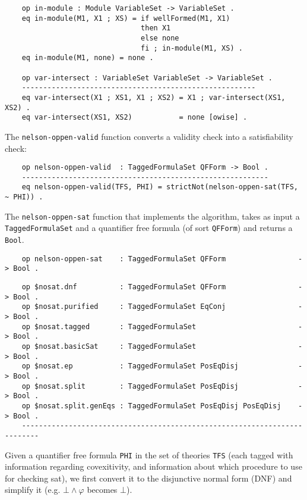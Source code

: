 \documentclass[]{article}
\renewcommand \phi {\varphi}
\begin{document}
\begin{verbatim}
    op in-module : Module VariableSet -> VariableSet .
    eq in-module(M1, X1 ; XS) = if wellFormed(M1, X1)
                                then X1
                                else none
                                fi ; in-module(M1, XS) .
    eq in-module(M1, none) = none .

    op var-intersect : VariableSet VariableSet -> VariableSet .
    -------------------------------------------------------
    eq var-intersect(X1 ; XS1, X1 ; XS2) = X1 ; var-intersect(XS1, XS2) .
    eq var-intersect(XS1, XS2)           = none [owise] .
\end{verbatim}

The \texttt{nelson-oppen-valid} function converts a validity check into
a satisfiability check:

\begin{verbatim}
    op nelson-oppen-valid  : TaggedFormulaSet QFForm -> Bool .
    ----------------------------------------------------------
    eq nelson-oppen-valid(TFS, PHI) = strictNot(nelson-oppen-sat(TFS, ~ PHI)) .
\end{verbatim}

The \texttt{nelson-oppen-sat} function that implements the algorithm,
takes as input a \texttt{TaggedFormulaSet} and a quantifier free formula
(of sort \texttt{QFForm}) and returns a \texttt{Bool}.

\begin{verbatim}
    op nelson-oppen-sat    : TaggedFormulaSet QFForm                 -> Bool .
\end{verbatim}

\begin{verbatim}
    op $nosat.dnf          : TaggedFormulaSet QFForm                 -> Bool .
    op $nosat.purified     : TaggedFormulaSet EqConj                 -> Bool .
    op $nosat.tagged       : TaggedFormulaSet                        -> Bool .
    op $nosat.basicSat     : TaggedFormulaSet                        -> Bool .
    op $nosat.ep           : TaggedFormulaSet PosEqDisj              -> Bool .
    op $nosat.split        : TaggedFormulaSet PosEqDisj              -> Bool .
    op $nosat.split.genEqs : TaggedFormulaSet PosEqDisj PosEqDisj    -> Bool .
    --------------------------------------------------------------------------
\end{verbatim}

Given a quantifier free formula \texttt{PHI} in the set of theories
\texttt{TFS} (each tagged with information regarding covexitivity, and
information about which procedure to use for checking sat), we first
convert it to the disjunctive normal form (DNF) and simplify it (e.g.
\(\bot \land \phi\) becomes \(\bot\)).
\end{document}
